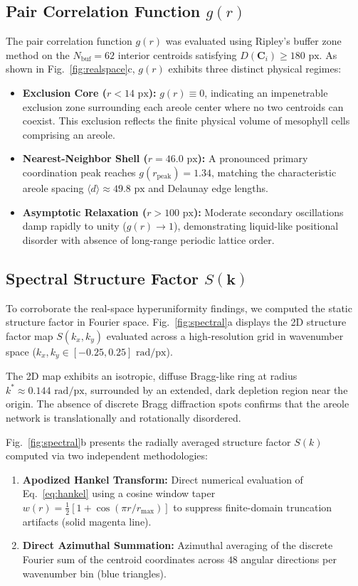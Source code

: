 \documentclass[10pt,twocolumn]{article}
\begin{document}
\subsection{Pair Correlation Function \texorpdfstring{$g(r)$}{g(r)}}
The pair correlation function $g(r)$ was evaluated using Ripley's buffer zone method on the $N_{\mathrm{buf}} = 62$ interior centroids satisfying $D(\mathbf{C}_i) \ge 180\text{ px}$. As shown in Fig.~\ref{fig:realspace}c, $g(r)$ exhibits three distinct physical regimes:
\begin{itemize}
    \item \textbf{Exclusion Core ($r < 14\text{ px}$):} $g(r) \equiv 0$, indicating an impenetrable exclusion zone surrounding each areole center where no two centroids can coexist. This exclusion reflects the finite physical volume of mesophyll cells comprising an areole.
    \item \textbf{Nearest-Neighbor Shell ($r = 46.0\text{ px}$):} A pronounced primary coordination peak reaches $g(r_{\mathrm{peak}}) = 1.34$, matching the characteristic areole spacing $\langle d \rangle \approx 49.8\text{ px}$ and Delaunay edge lengths.
    \item \textbf{Asymptotic Relaxation ($r > 100\text{ px}$):} Moderate secondary oscillations damp rapidly to unity ($g(r) \to 1$), demonstrating liquid-like positional disorder with absence of long-range periodic lattice order.
\end{itemize}

\subsection{Spectral Structure Factor \texorpdfstring{$S(\mathbf{k})$}{S(k)}}
To corroborate the real-space hyperuniformity findings, we computed the static structure factor in Fourier space. Fig.~\ref{fig:spectral}a displays the 2D structure factor map $S(k_x, k_y)$ evaluated across a high-resolution grid in wavenumber space ($k_x, k_y \in [-0.25, 0.25]\text{ rad/px}$).

The 2D map exhibits an isotropic, diffuse Bragg-like ring at radius $k^* \approx 0.144\text{ rad/px}$, surrounded by an extended, dark depletion region near the origin. The absence of discrete Bragg diffraction spots confirms that the areole network is translationally and rotationally disordered.

Fig.~\ref{fig:spectral}b presents the radially averaged structure factor $S(k)$ computed via two independent methodologies:
\begin{enumerate}
    \item \textbf{Apodized Hankel Transform:} Direct numerical evaluation of Eq.~\eqref{eq:hankel} using a cosine window taper $w(r) = \frac{1}{2}[1 + \cos(\pi r / r_{\mathrm{max}})]$ to suppress finite-domain truncation artifacts (solid magenta line).
    \item \textbf{Direct Azimuthal Summation:} Azimuthal averaging of the discrete Fourier sum of the centroid coordinates across $48$ angular directions per wavenumber bin (blue triangles).
\end{enumerate}
\end{document}
